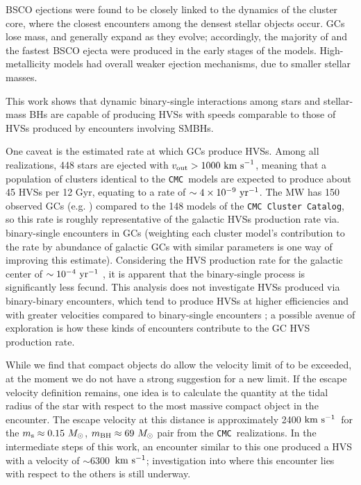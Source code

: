 \documentclass[twocolumn]{aastex631}
\newcommand{\kms}{${\rm km~s^{-1}}$}
\newcommand{\CMC}{\texttt{CMC}}
\newcommand{\CMCcat}{\texttt{CMC Cluster Catalog}}
\begin{document}
BSCO ejections were found to be closely linked to the dynamics of the cluster core, where the closest encounters among the densest stellar objects occur.
GCs lose mass, and generally expand as they evolve; accordingly, the majority of and the fastest BSCO ejecta were produced in the early stages of the models.
High-metallicity models had overall weaker ejection mechanisms, due to smaller stellar masses.


This work shows that dynamic binary-single interactions among stars and stellar-mass BHs are capable of producing HVSs with speeds comparable to those of HVSs produced by encounters involving SMBHs.

One caveat is the estimated rate at which GCs produce HVSs.
Among all realizations, 448 stars are ejected with $v_{\rm out}>1000~{\rm km~s}^{-1}$, meaning that a population of clusters identical to the \CMC\ models are expected to produce about 45 HVSs per 12 Gyr, equating to a rate of $\sim 4 \times 10^{-9}~{\rm yr}^{-1}$.
The MW has 150 observed GCs (e.g. \citealt{2018MNRAS.478.1520B}) compared to the 148 models of the \CMCcat, so this rate is roughly representative of the galactic HVSs production rate via. binary-single encounters in GCs (weighting each cluster model's contribution to the rate by abundance of galactic GCs with similar parameters is one way of improving this estimate).
Considering the HVS production rate for the galactic center of $\sim 10^{-4}~{\rm yr}^{-1}$ \citep{2015ARA&A..53...15B}, it is apparent that the binary-single process is significantly less fecund.
This analysis does not investigate HVSs produced via binary-binary encounters, which tend to produce HVSs at higher efficiencies and with greater velocities compared to binary-single encounters \citep{1991AJ....101..562L}; a possible avenue of exploration is how these kinds of encounters contribute to the GC HVS production rate.

While we find that compact objects do allow the velocity limit of \citet{1991AJ....101..562L} to be exceeded, at the moment we do not have a strong suggestion for a new limit.
If the escape velocity definition remains, one idea is to calculate the quantity at the tidal radius of the star with respect to the most massive compact object in the encounter.
The escape velocity at this distance is approximately 2400 \kms\ for the $m_{\rm s}\approx0.15~M_\odot$, $m_{\rm BH}\approx69~M_\odot$ pair from the \CMC\ realizations.
In the intermediate steps of this work, an encounter similar to this one produced a HVS with a velocity of $\sim$6300~\kms; investigation into where this encounter lies with respect to the others is still underway.
\end{document}
